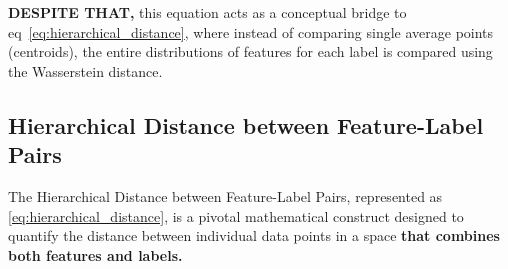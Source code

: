\documentclass[11pt, a4paper]{article}
\theoremstyle{plain} %
\theoremstyle{definition} %
\begin{document}
			\textbf{DESPITE THAT,} this equation acts as a conceptual bridge to eq~\ref{eq:hierarchical_distance}, where instead of comparing single average points (centroids), the entire distributions of features for each label is compared using the Wasserstein distance.


		\subsection{Hierarchical Distance between Feature-Label Pairs}
		\label{sec:hierarchical_distance}
			The Hierarchical Distance between Feature-Label Pairs, represented as \cref{eq:hierarchical_distance}, is a pivotal mathematical construct designed to quantify the distance between individual data points in a space \textbf{that combines both features and labels.}
\end{document}
